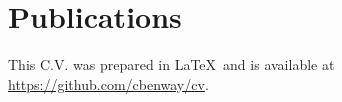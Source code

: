 \documentclass[letterpaper, 10pt]{article}
\begin{document}
\section*{Publications}
\begingroup
   \renewcommand{\section}[2]{}
   
   \nocite{*}
   
\endgroup

\vfill

\footnotesize
This C.V. was prepared in \LaTeX\ and is available at \href{https://github.com/cbenway/cv}{https://github.com/cbenway/cv}.
\end{document}
